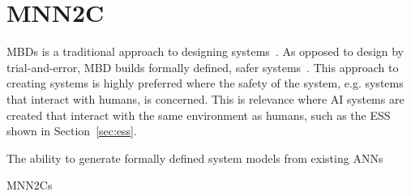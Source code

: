 \section{\acf{MNN2C}}
\label{sec:mnn2c}
\acfp{MBD} is a traditional approach to designing systems~\cite{dmd2019}.
As opposed to design by trial-and-error, \ac{MBD} builds formally defined, safer systems~\cite{dmd2019}.
This approach to creating systems is highly preferred where the safety of the system, e.g. systems that interact with humans, is concerned.
This is relevance where \ac{AI} systems are created that interact with the same environment as humans, such as the \acf{ESS} shown in Section~\ref{sec:ess}.

The ability to generate formally defined system models from existing \acp{ANN} 

\acfp{MNN2C} 